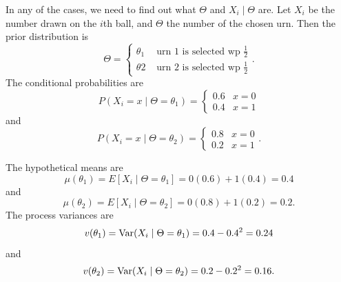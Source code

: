 \documentclass[notoc,notitlepage]{tufte-book}
\begin{document}
\begin{solution}
  In any of the cases, we need to find out what $\Theta$ and $X_i \mid \Theta$ 
  are. Let $X_i$ be the number drawn on the $i$th ball, and $\Theta$ the number
  of the chosen urn. Then the prior distribution is
  \begin{equation*}
    \Theta = \begin{cases}
      \theta_1 & \text{ urn 1 is selected wp } \frac{1}{2} \\
      \theta2 & \text{ urn 2 is selected wp } \frac{1}{2}
    \end{cases}.
  \end{equation*}
  The conditional probabilities are
  \begin{equation*}
    P(X_i = x \mid \Theta = \theta_1) = \begin{cases}
      0.6 & x = 0 \\
      0.4 & x = 1
    \end{cases}
  \end{equation*}
  and
  \begin{equation*}
    P(X_i = x \mid \Theta = \theta_2) = \begin{cases}
      0.8 & x = 0 \\
      0.2 & x = 1
    \end{cases}.
  \end{equation*}

  \noindent
  The hypothetical means are
  \begin{equation*}
    \mu(\theta_1) = E[X_i \mid \Theta = \theta_1] = 0(0.6) + 1(0.4) = 0.4
  \end{equation*}
  and
  \begin{equation*}
    \mu(\theta_2) = E[X_i \mid \Theta = \theta_2] = 0(0.8) + 1(0.2) = 0.2.
  \end{equation*}
  The process variances are
  \begin{equation*}
    v(\theta_1) = \operatorname{Var}(X_i \mid \Theta = \theta_1) = 0.4 - 0.4^2 = 0.24
  \end{equation*}
  and
  \begin{equation*}
    v(\theta_2) = \operatorname{Var}(X_i \mid \Theta = \theta_2) = 0.2 - 0.2^2 = 0.16.
  \end{equation*}


\end{solution}
\end{document}

